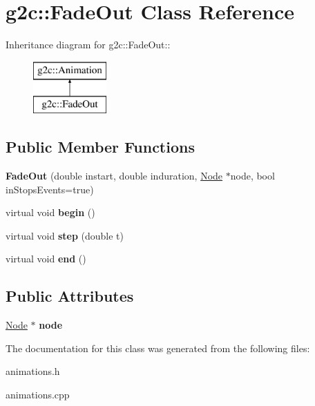 \hypertarget{classg2c_1_1_fade_out}{
\section{g2c::FadeOut Class Reference}
\label{classg2c_1_1_fade_out}
}
Inheritance diagram for g2c::FadeOut::\begin{figure}[H]
\begin{center}
\leavevmode
\includegraphics[height=2cm]{classg2c_1_1_fade_out}
\end{center}
\end{figure}
\subsection*{Public Member Functions}
\begin{DoxyCompactItemize}
\item 
\hypertarget{classg2c_1_1_fade_out_a41c6fefd44e5bd35925298ec821d9303}{
{\bfseries FadeOut} (double instart, double induration, \hyperlink{classg2c_1_1_node}{Node} $\ast$node, bool inStopsEvents=true)}
\label{classg2c_1_1_fade_out_a41c6fefd44e5bd35925298ec821d9303}

\item 
\hypertarget{classg2c_1_1_fade_out_a6879b534e78f9ea3449e2826d3fae279}{
virtual void {\bfseries begin} ()}
\label{classg2c_1_1_fade_out_a6879b534e78f9ea3449e2826d3fae279}

\item 
\hypertarget{classg2c_1_1_fade_out_a187ad5e8189335250d6c23018fb72e41}{
virtual void {\bfseries step} (double t)}
\label{classg2c_1_1_fade_out_a187ad5e8189335250d6c23018fb72e41}

\item 
\hypertarget{classg2c_1_1_fade_out_a2ee780b3192dcc478ce0171c1cdd5f3f}{
virtual void {\bfseries end} ()}
\label{classg2c_1_1_fade_out_a2ee780b3192dcc478ce0171c1cdd5f3f}

\end{DoxyCompactItemize}
\subsection*{Public Attributes}
\begin{DoxyCompactItemize}
\item 
\hypertarget{classg2c_1_1_fade_out_aeb2f3efc76b0afdebdd827b39dc4b60f}{
\hyperlink{classg2c_1_1_node}{Node} $\ast$ {\bfseries node}}
\label{classg2c_1_1_fade_out_aeb2f3efc76b0afdebdd827b39dc4b60f}

\end{DoxyCompactItemize}


The documentation for this class was generated from the following files:\begin{DoxyCompactItemize}
\item 
animations.h\item 
animations.cpp\end{DoxyCompactItemize}
